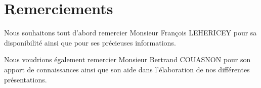 \documentclass[a4paper,11pt]{article}
\begin{document}
	
	\section{Remerciements}
		Nous souhaitons tout d'abord remercier Monsieur François LEHERICEY pour sa disponibilité ainsi que pour ses précieuses informations.
		
		Nous voudrions également remercier Monsieur Bertrand COUASNON pour son apport de connaissances ainsi que son aide dans l'élaboration de nos différentes présentations.
		

\end{document}
